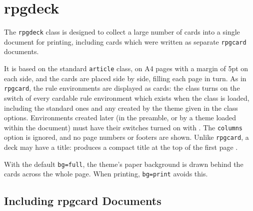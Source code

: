 	\section{rpgdeck}\label{S:deckClass}

		The \texttt{rpgdeck} class is designed to collect a large number of cards  into a single document for printing, including cards which were written as separate \texttt{rpgcard} documents.

		It is based on the standard \texttt{article} class, on A4 pages with a margin of 5pt on each side, and the cards are placed side by side, filling each page in turn. As in \texttt{rpgcard}, the rule environments are displayed as cards: the class turns on the switch of every cardable rule environment which exists when the class is loaded, including the standard ones and any created by the theme given in the class options. Environments created later (in the preamble, or by a theme loaded within the document) must have their switches turned on with . The \texttt{columns} option is ignored, and no page numbers or footers are shown. Unlike \texttt{rpgcard}, a deck may have a title:  produces a compact title at the top of the first page .

		With the default \texttt{bg=full}, the theme's paper background is drawn behind the cards across the whole page. When printing, \texttt{bg=print} avoids this.

		\subsection{Including rpgcard Documents}

